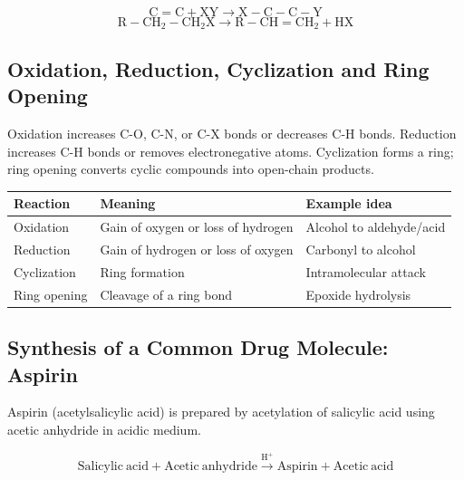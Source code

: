 \documentclass[12pt,a4paper]{article}
\begin{document}
\begin{tcolorbox}[formulabox, title={Typical Patterns}]
\[
\mathrm{C=C + XY \rightarrow X-C-C-Y}
\]
\[
\mathrm{R-CH_2-CH_2X \rightarrow R-CH=CH_2 + HX}
\]
\end{tcolorbox}

\subsection{Oxidation, Reduction, Cyclization and Ring Opening}
Oxidation increases C-O, C-N, or C-X bonds or decreases C-H bonds. Reduction increases C-H bonds or removes electronegative atoms. Cyclization forms a ring; ring opening converts cyclic compounds into open-chain products.

\begin{tabularx}{\linewidth}{|B{3cm}|Y|Y|}
\hline
\textbf{Reaction} & \textbf{Meaning} & \textbf{Example idea} \\
\hline
Oxidation & Gain of oxygen or loss of hydrogen & Alcohol to aldehyde/acid \\
\hline
Reduction & Gain of hydrogen or loss of oxygen & Carbonyl to alcohol \\
\hline
Cyclization & Ring formation & Intramolecular attack \\
\hline
Ring opening & Cleavage of a ring bond & Epoxide hydrolysis \\
\hline
\end{tabularx}

\subsection{Synthesis of a Common Drug Molecule: Aspirin}
Aspirin (acetylsalicylic acid) is prepared by acetylation of salicylic acid using acetic anhydride in acidic medium.

\begin{tcolorbox}[formulabox, title={Aspirin Synthesis Reaction}]
\[
\mathrm{Salicylic\ acid + Acetic\ anhydride \xrightarrow{H^+} Aspirin + Acetic\ acid}
\]
\end{tcolorbox}

\begin{tcolorbox}[tikzbox, title={Flow Diagram for Aspirin Preparation}]
\centering
{}
\end{tcolorbox}
\end{document}
